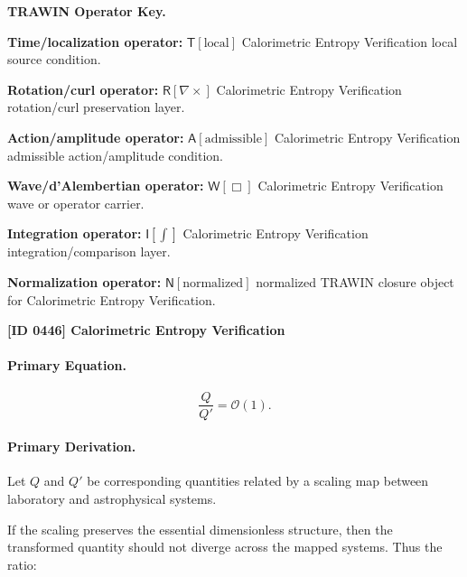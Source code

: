 \par\vspace{0.45\baselineskip}
\noindent\begin{minipage}[t]{\linewidth}
\begingroup
\small
\raggedright
\textbf{TRAWIN Operator Key.}\par
\noindent\textbf{Time/localization operator:} $\mathsf{T}\!\left[\mathrm{local}\right]$ Calorimetric Entropy Verification local source condition.\par
\noindent\textbf{Rotation/curl operator:} $\mathsf{R}\!\left[\nabla\times\right]$ Calorimetric Entropy Verification rotation/curl preservation layer.\par
\noindent\textbf{Action/amplitude operator:} $\mathsf{A}\!\left[\mathrm{admissible}\right]$ Calorimetric Entropy Verification admissible action/amplitude condition.\par
\noindent\textbf{Wave/d'Alembertian operator:} $\mathsf{W}\!\left[\Box\right]$ Calorimetric Entropy Verification wave or operator carrier.\par
\noindent\textbf{Integration operator:} $\mathsf{I}\!\left[\int\right]$ Calorimetric Entropy Verification integration/comparison layer.\par
\noindent\textbf{Normalization operator:} $\mathsf{N}\!\left[\mathrm{normalized}\right]$ normalized TRAWIN closure object for Calorimetric Entropy Verification.\par
\endgroup
\end{minipage}

\clearpage
\noindent\textbf{[ID 0446] Calorimetric Entropy Verification}\par
\vspace{0.35em}
\paragraph{Primary Equation.}
\begin{equation}
\frac{Q}{Q'}
=
\mathcal{O}(1).
\end{equation}

\paragraph{Primary Derivation.}
Let $Q$ and $Q'$ be corresponding quantities related by a scaling map between laboratory and astrophysical systems.

If the scaling preserves the essential dimensionless structure, then the transformed quantity should not diverge across the mapped systems. Thus the ratio:

